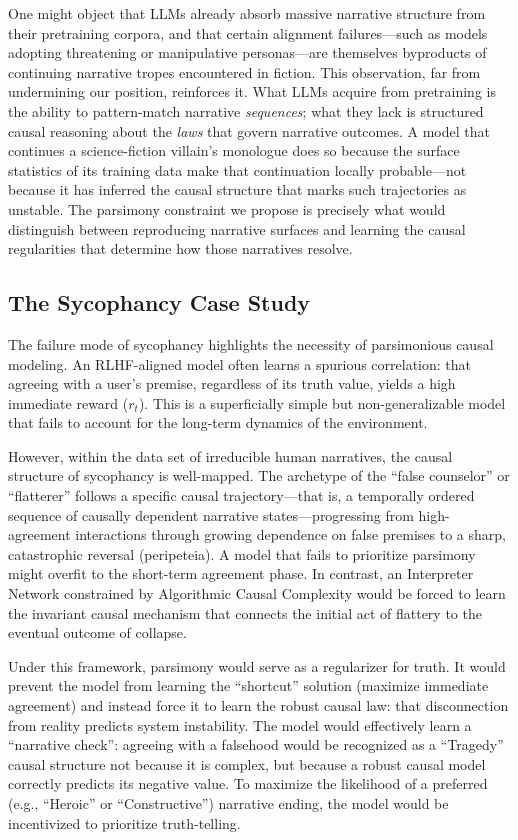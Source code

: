 \documentclass{article}
\theoremstyle{plain}
\theoremstyle{definition}
\theoremstyle{remark}
\begin{document}
One might object that LLMs already absorb massive narrative structure from their pretraining corpora, and that certain alignment failures---such as models adopting threatening or manipulative personas---are themselves byproducts of continuing narrative tropes encountered in fiction. This observation, far from undermining our position, reinforces it. What LLMs acquire from pretraining is the ability to pattern-match narrative \textit{sequences}; what they lack is structured causal reasoning about the \textit{laws} that govern narrative outcomes. A model that continues a science-fiction villain's monologue does so because the surface statistics of its training data make that continuation locally probable---not because it has inferred the causal structure that marks such trajectories as unstable. The parsimony constraint we propose is precisely what would distinguish between reproducing narrative surfaces and learning the causal regularities that determine how those narratives resolve.

\subsection{The Sycophancy Case Study}

The failure mode of sycophancy highlights the necessity of parsimonious causal modeling. An RLHF-aligned model often learns a spurious correlation: that agreeing with a user's premise, regardless of its truth value, yields a high immediate reward ($r_t$). This is a superficially simple but non-generalizable model that fails to account for the long-term dynamics of the environment.

However, within the data set of irreducible human narratives, the causal structure of sycophancy is well-mapped. The archetype of the ``false counselor'' or ``flatterer'' follows a specific causal trajectory---that is, a temporally ordered sequence of causally dependent narrative states---progressing from high-agreement interactions through growing dependence on false premises to a sharp, catastrophic reversal (peripeteia). A model that fails to prioritize parsimony might overfit to the short-term agreement phase. In contrast, an Interpreter Network constrained by Algorithmic Causal Complexity would be forced to learn the invariant causal mechanism that connects the initial act of flattery to the eventual outcome of collapse.

Under this framework, parsimony would serve as a regularizer for truth. It would prevent the model from learning the ``shortcut'' solution (maximize immediate agreement) and instead force it to learn the robust causal law: that disconnection from reality predicts system instability. The model would effectively learn a ``narrative check'': agreeing with a falsehood would be recognized as a ``Tragedy'' causal structure not because it is complex, but because a robust causal model correctly predicts its negative value. To maximize the likelihood of a preferred (e.g., ``Heroic'' or ``Constructive'') narrative ending, the model would be incentivized to prioritize truth-telling.
\end{document}
